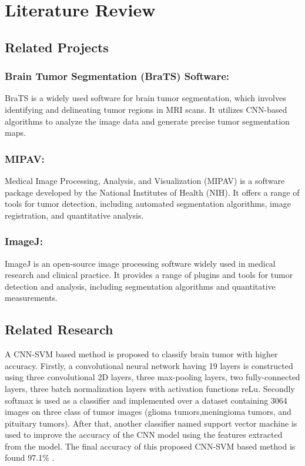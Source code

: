 \chapter{Literature Review}
\vspace{-18pt}
\section{Related Projects}
\vspace{-18pt}
\subsection{
Brain Tumor Segmentation (BraTS) Software:}
\vspace{-18pt}
BraTS is a widely used software for brain tumor segmentation, which involves identifying and delineating tumor regions in MRI scans. It utilizes CNN-based algorithms to analyze the image data and generate precise tumor segmentation maps.
 \vspace{-10pt}
\subsection{MIPAV:}
\vspace{-18pt}
Medical Image Processing, Analysis, and Visualization (MIPAV) is a software package developed by the National Institutes of Health (NIH). It offers a range of tools for tumor detection, including automated segmentation algorithms, image registration, and quantitative analysis.
\vspace{-10pt}
\subsection{ImageJ:}
\vspace{-18pt}
ImageJ is an open-source image processing software widely used in medical research and clinical practice. It provides a range of plugins and tools for tumor detection and analysis, including segmentation algorithms and quantitative measurements.   
\vspace{-10pt}

\section{Related Research}
\vspace{-18pt}
A CNN-SVM based method is proposed to classify brain tumor with higher accuracy. Firstly, a convolutional neural network having 19 layers is constructed using three convolutional 2D layers, three max-pooling layers, two fully-connected layers, three batch normalization layers with activation functions reLu. Secondly softmax is used as a classifier and implemented over a dataset containing 3064 images on three class of tumor images (glioma tumors,meningioma tumors, and pituitary tumors). After that, another classifier named support vector machine is used to improve the accuracy of the CNN model using the features extracted from the model. The final accuracy of this proposed CNN-SVM based method is found 97.1\% \cite{Sejuti2021}.
\newpage
 
